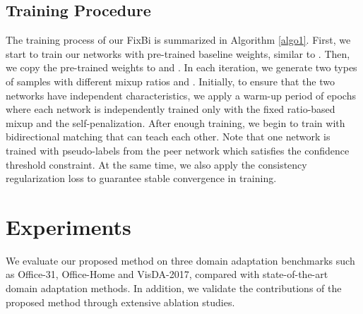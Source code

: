 \documentclass[final]{cvpr}
\begin{document}
\subsection{Training Procedure}
The training process of our FixBi is summarized in Algorithm \ref{algo1}. First, we start to train our networks with pre-trained baseline weights, similar to \cite{Gu2020}. Then, we copy the pre-trained weights to  and . In each iteration, we generate two types of samples with different mixup ratios  and . Initially, to ensure that the two networks have independent characteristics, we apply a warm-up period of  epochs where each network is independently trained only with the fixed ratio-based mixup and the self-penalization. After enough training, we begin to train with bidirectional matching that can teach each other. Note that one network is trained with pseudo-labels from the peer network which satisfies the confidence threshold constraint. At the same time, we also apply the consistency regularization loss to guarantee stable convergence in training.

\begin{table}[t]
\centering
\caption{Comparison of three different mixup-ratio rules on the task AW.}
\label{table1}
\end{table}

\section{Experiments}
We evaluate our proposed method on three domain adaptation benchmarks such as Office-31, Office-Home and VisDA-2017, compared with state-of-the-art domain adaptation methods. In addition, we validate the contributions of the proposed method through extensive ablation studies.
\end{document}
